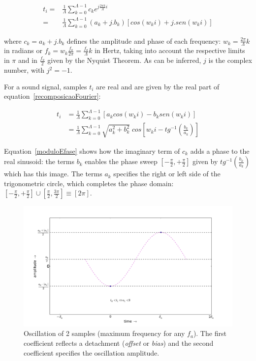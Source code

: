 \documentclass[
 aip,
 jmp,
 amsmath,amssymb,
 reprint,
]{revtex4-1}
\begin{document}
\begin{equation}\label{recomposicaoFourier}
\begin{split}
t_i = & \frac{1}{\Lambda}\sum_{k=0}^{\Lambda-1}c_ke^{j \frac{2\pi k}{\Lambda} i } \\ 
    = & \frac{1}{\Lambda}\sum_{k=0}^{\Lambda-1}(a_k+ j . b_k)\left[cos(w_k i)   +j . sen(w_k i)\right]
\end{split}
\end{equation}

where $c_k = a_k + j . b_k$ defines the amplitude and phase of each frequency: $w_k=\frac{2\pi}{\Lambda}k$ in radians or $f_k=w_k\frac{f_a}{2\pi}=\frac{f_a}{\Lambda}k$ in Hertz, taking into account the respective limits in $\pi$ and in $\frac{f_a}{2}$ given by the Nyquist Theorem. As can be inferred, $j$ is the complex number, with $j^2=-1$.

For a sound signal, samples $t_i$ are real and are given by the real part of equation~\ref{recomposicaoFourier}:

\begin{equation}\label{moduloEfase}
\begin{split}
t_i& = \frac{1}{\Lambda}\sum_{k=0}^{\Lambda-1}\left[a_k cos(w_k i) -b_k sen(w_k i)\right] \\
   & = \frac{1}{\Lambda}\sum_{k=0}^{\Lambda-1}\sqrt{a_k^2 + b_k^2} \; cos\left[w_k i - tg^{-1}\left(\frac{b_k}{a_k}\right)\right]
\end{split}
\end{equation}

Equation~\ref{moduloEfase} shows how the imaginary term of $c_k$ adds a phase to the real sinusoid: the terms $b_k$ enables the phase sweep $\left[-\frac{\pi}{2},+\frac{\pi}{2}\right]$ given by $tg^{-1}\left(\frac{b_k}{a_k}\right)$ which has this image. The terms $a_k$ specifies the right or left side of the trigonometric circle, which completes the phase domain: $\left[-\frac{\pi}{2},+\frac{\pi}{2}\right] \cup \left[\frac{\pi}{2},\frac{3\pi}{2}\right]\equiv [2\pi]$.



 \begin{figure}[h!]
     \centering
         \includegraphics[width=\columnwidth]{figures/amostras2c__}
     \caption{Oscillation of 2 samples (maximum frequency for any $f_a$). The first coefficient reflects a detachment (\emph{offset} or \emph{bias}) and the second coefficient specifies the oscillation amplitude.}
         \label{fig:amostras2}
 \end{figure}
\end{document}
